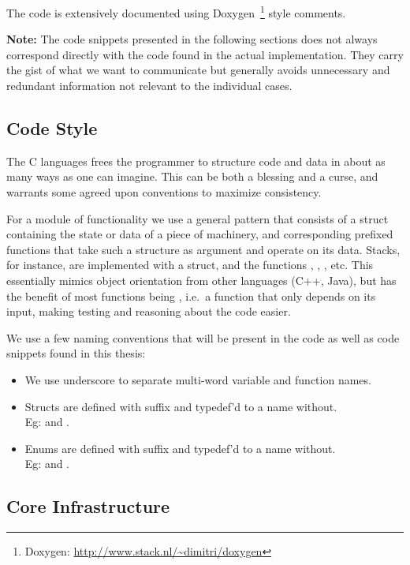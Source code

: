 The code is extensively documented using Doxygen~\footnote{Doxygen:
  \url{http://www.stack.nl/~dimitri/doxygen}} style comments.

\textbf{Note:} The code snippets presented in the following sections does not
always correspond directly with the code found in the actual
implementation. They carry the gist of what we want to communicate but generally
avoids unnecessary and redundant information not relevant to the individual
cases.

\subsection{Code Style}

The C languages frees the programmer to structure code and data in about as many
ways as one can imagine. This can be both a blessing and a curse, and warrants
some agreed upon conventions to maximize consistency.

For a module of functionality we use a general pattern that consists of a struct
containing the state or data of a piece of machinery, and corresponding prefixed
functions that take such a structure as argument and operate on its
data. Stacks, for instance, are implemented with a  struct, and the
functions , , , etc. This
essentially mimics object orientation from other languages (C++, Java), but has
the benefit of most functions being , i.e.~a function that only
depends on its input, making testing and reasoning about the code easier.

We use a few naming conventions that will be present in the code as well as code
snippets found in this thesis: %

\begin{itemize}
\item We use underscore to separate multi-word variable and function names.
\item Structs are defined with  suffix and typedef'd to a name
  without.\\Eg:  and .
\item Enums are defined with  suffix and typedef'd to a name
  without.\\Eg:  and .
\end{itemize}

\subsection{Core Infrastructure}
\label{sec:implementation:core}

